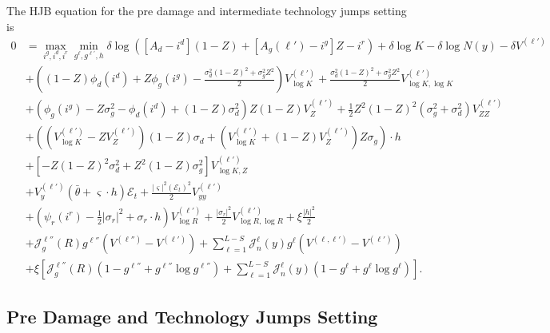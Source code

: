 \documentclass[12pt]{article}
\begin{document}
\begin{appendices}
The HJB equation for the pre damage and intermediate technology jumps setting is
\begin{equation*}
\begin{split}
 0 & = \max_{i^{g},i^{d},i^{r}} \min_{g^{\ell}, g^{\ell'}, h} \delta\log([A_{d}-i^{d}](1-Z)+[A_{g}(\ell')-i^{g}]Z -i^{r}) + \delta\log K - \delta \log N(y) - \delta V^{(\ell')}\\
& + \left((1-Z) \phi_d(i^{d}) +Z \phi_g(i^{g}) -\frac{   \sigma_d^2 (1-Z)^2 + \sigma_g^2 Z^2 }{2} \right)V^{(\ell')}_{\log K} + \frac{  \sigma_d^2 (1-Z)^2 + \sigma_g^2 Z^2}{2} V^{(\ell')}_{\log K,  \log K}  \\
 & +\left( \phi_g(i^{g}) - Z \sigma_g^2 - \phi_d(i^{d}) + (1-Z) \sigma_d^2  \right) Z (1-Z) V^{(\ell')}_{Z}+ \frac{1}{2} Z^2 (1-Z)^2 ({ \sigma_g^2 + \sigma_d^2} ) V^{(\ell')}_{ZZ} \\
 & + \left( \left( V^{(\ell')}_{\log K} -  Z V^{(\ell')}_{Z} \right) (1-Z) \sigma_d  + \left( V^{(\ell')}_{\log K} + (1-Z) V^{(\ell')}_{Z} \right)  Z \sigma_g \right) \cdot h \\
  & + \left[-Z(1-Z)^2\sigma_d^2 + Z^2(1-Z)\sigma_g^2\right]V^{(\ell')}_{\log K, Z} \\
 & + V^{(\ell')}_{y} (\bar{\theta} + \varsigma \cdot h) \mathcal{E}_t +\frac{|\varsigma|^{2}( \mathcal{E}_t)^{2}}{2} V^{(\ell')}_{yy} \\
  & +\left(\psi_{r}(i^{r})-\frac{1}{2}|\sigma_{r}|^{2} + \sigma_{r} \cdot h \right) V^{(\ell')}_{\log R}  +\frac{|\sigma_{r}|^{2}}{2}V^{(\ell')}_{\log R,\log R} + \xi \frac{|h|^2}{2} \\
& + \mathcal{J}^{\ell''}_g(R) g^{\ell''} (V^{(\ell'')}-V^{(\ell')}) + \sum_{\ell=1}^{L-S} \mathcal{J}^{\ell}_n(y) g^{\ell} (V^{(\ell,\ell')} - V^{(\ell')}) \\
& + \xi \left[ \mathcal{J}^{\ell''}_g(R) \left( 1 - g^{\ell''} + g^{\ell''} \log g^{\ell''} \right)  + \sum_{\ell=1}^{L-S} \mathcal{J}^{\ell}_n(y) \left( 1 - g^{\ell} + g^{\ell} \log g^{\ell} \right) \right].
\end{split}
\end{equation*}


\subsection{Pre Damage and Technology Jumps Setting}


\end{appendices}
\end{document}
